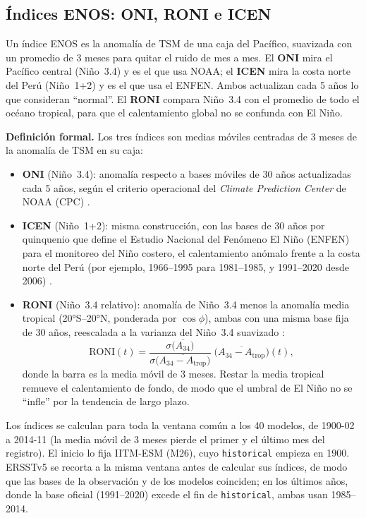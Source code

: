 \documentclass[11pt,a4paper]{article}
\begin{document}
\subsection{Índices ENOS: ONI, RONI e ICEN}
\label{sec:indices}

\begin{basico}
Un índice ENOS es la anomalía de TSM de una caja del Pacífico, suavizada con un promedio de 3 meses para quitar el ruido de mes a mes. El \textbf{ONI} mira el Pacífico central (Niño~3.4) y es el que usa NOAA; el \textbf{ICEN} mira la costa norte del Perú (Niño~1+2) y es el que usa el ENFEN. Ambos actualizan cada 5 años lo que consideran ``normal''. El \textbf{RONI} compara Niño~3.4 con el promedio de todo el océano tropical, para que el calentamiento global no se confunda con El Niño.
\end{basico}

\noindent\textbf{Definición formal.} Los tres índices son medias móviles centradas de 3 meses de la anomalía de TSM en su caja:
\begin{itemize}[nosep]
\item \textbf{ONI} (Niño~3.4): anomalía respecto a bases móviles de 30 años actualizadas cada 5 años, según el criterio operacional del \emph{Climate Prediction Center} de NOAA (CPC) \citep{trenberth1997}.
\item \textbf{ICEN} (Niño~1+2): misma construcción, con las bases de 30 años por quinquenio que define el Estudio Nacional del Fenómeno El Niño (ENFEN) para el monitoreo del Niño costero, el calentamiento anómalo frente a la costa norte del Perú (por ejemplo, 1966--1995 para 1981--1985, y 1991--2020 desde 2006) \citep{takahashi2014,enfen2024}.
\item \textbf{RONI} (Niño~3.4 relativo): anomalía de Niño~3.4 menos la anomalía media tropical (20°S--20°N, ponderada por $\cos\phi$), ambas con una misma base fija de 30 años, reescalada a la varianza del Niño~3.4 suavizado \citep{vanoldenborgh2021}:
\begin{equation}
\label{eq:roni}
\mathrm{RONI}(t) = \frac{\sigma\big(\overline{A_{34}}\big)}{\sigma\big(\overline{A_{34}-A_{\mathrm{trop}}}\big)}\;\overline{\big(A_{34}-A_{\mathrm{trop}}\big)}(t),
\end{equation}
donde la barra es la media móvil de 3 meses. Restar la media tropical remueve el calentamiento de fondo, de modo que el umbral de El Niño no se ``infle'' por la tendencia de largo plazo.
\end{itemize}
Los índices se calculan para toda la ventana común a los 40 modelos, de 1900-02 a 2014-11 (la media móvil de 3 meses pierde el primer y el último mes del registro). El inicio lo fija IITM-ESM (M26), cuyo \texttt{historical} empieza en 1900. ERSSTv5 se recorta a la misma ventana antes de calcular sus índices, de modo que las bases de la observación y de los modelos coinciden; en los últimos años, donde la base oficial (1991--2020) excede el fin de \texttt{historical}, ambas usan 1985--2014.
\end{document}
